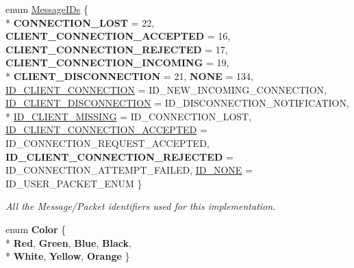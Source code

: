 \begin{DoxyCompactItemize}
enum \hyperlink{namespace_champ_net_plugin_a2ade5cfa7cf6c25ab7236c6b54a57821}{Message\-I\-Ds} \{ \\*
{\bfseries C\-O\-N\-N\-E\-C\-T\-I\-O\-N\-\_\-\-L\-O\-S\-T} = 22, 
{\bfseries C\-L\-I\-E\-N\-T\-\_\-\-C\-O\-N\-N\-E\-C\-T\-I\-O\-N\-\_\-\-A\-C\-C\-E\-P\-T\-E\-D} = 16, 
{\bfseries C\-L\-I\-E\-N\-T\-\_\-\-C\-O\-N\-N\-E\-C\-T\-I\-O\-N\-\_\-\-R\-E\-J\-E\-C\-T\-E\-D} = 17, 
{\bfseries C\-L\-I\-E\-N\-T\-\_\-\-C\-O\-N\-N\-E\-C\-T\-I\-O\-N\-\_\-\-I\-N\-C\-O\-M\-I\-N\-G} = 19, 
\\*
{\bfseries C\-L\-I\-E\-N\-T\-\_\-\-D\-I\-S\-C\-O\-N\-N\-E\-C\-T\-I\-O\-N} = 21, 
{\bfseries N\-O\-N\-E} = 134, 
\hyperlink{namespace_champ_net_plugin_a2ade5cfa7cf6c25ab7236c6b54a57821aecc0564c52e3106cfe012e5533b080da}{I\-D\-\_\-\-C\-L\-I\-E\-N\-T\-\_\-\-C\-O\-N\-N\-E\-C\-T\-I\-O\-N} = I\-D\-\_\-\-N\-E\-W\-\_\-\-I\-N\-C\-O\-M\-I\-N\-G\-\_\-\-C\-O\-N\-N\-E\-C\-T\-I\-O\-N, 
\hyperlink{namespace_champ_net_plugin_a2ade5cfa7cf6c25ab7236c6b54a57821a2ed0fbbbbe782bca6c76277c89050ad9}{I\-D\-\_\-\-C\-L\-I\-E\-N\-T\-\_\-\-D\-I\-S\-C\-O\-N\-N\-E\-C\-T\-I\-O\-N} = I\-D\-\_\-\-D\-I\-S\-C\-O\-N\-N\-E\-C\-T\-I\-O\-N\-\_\-\-N\-O\-T\-I\-F\-I\-C\-A\-T\-I\-O\-N, 
\\*
\hyperlink{namespace_champ_net_plugin_a2ade5cfa7cf6c25ab7236c6b54a57821a31932f93b241ffddf903d32af0fc2155}{I\-D\-\_\-\-C\-L\-I\-E\-N\-T\-\_\-\-M\-I\-S\-S\-I\-N\-G} = I\-D\-\_\-\-C\-O\-N\-N\-E\-C\-T\-I\-O\-N\-\_\-\-L\-O\-S\-T, 
\hyperlink{namespace_champ_net_plugin_a2ade5cfa7cf6c25ab7236c6b54a57821a0295101371b4a70a1c007a4f6e206e1d}{I\-D\-\_\-\-C\-L\-I\-E\-N\-T\-\_\-\-C\-O\-N\-N\-E\-C\-T\-I\-O\-N\-\_\-\-A\-C\-C\-E\-P\-T\-E\-D} = I\-D\-\_\-\-C\-O\-N\-N\-E\-C\-T\-I\-O\-N\-\_\-\-R\-E\-Q\-U\-E\-S\-T\-\_\-\-A\-C\-C\-E\-P\-T\-E\-D, 
{\bfseries I\-D\-\_\-\-C\-L\-I\-E\-N\-T\-\_\-\-C\-O\-N\-N\-E\-C\-T\-I\-O\-N\-\_\-\-R\-E\-J\-E\-C\-T\-E\-D} = I\-D\-\_\-\-C\-O\-N\-N\-E\-C\-T\-I\-O\-N\-\_\-\-A\-T\-T\-E\-M\-P\-T\-\_\-\-F\-A\-I\-L\-E\-D, 
\hyperlink{namespace_champ_net_plugin_a2ade5cfa7cf6c25ab7236c6b54a57821aad940f5ef8633f353088061ccf06623d}{I\-D\-\_\-\-N\-O\-N\-E} = I\-D\-\_\-\-U\-S\-E\-R\-\_\-\-P\-A\-C\-K\-E\-T\-\_\-\-E\-N\-U\-M
 \}
\begin{DoxyCompactList}\small\item\em All the Message/\-Packet identifiers used for this implementation. \end{DoxyCompactList}\item 
enum {\bfseries Color} \{ \\*
{\bfseries Red}, 
{\bfseries Green}, 
{\bfseries Blue}, 
{\bfseries Black}, 
\\*
{\bfseries White}, 
{\bfseries Yellow}, 
{\bfseries Orange}
 \}
\end{DoxyCompactItemize}
